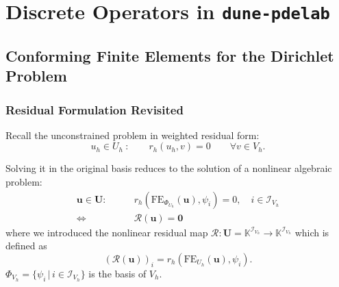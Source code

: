 \section{Discrete Operators in  \texttt{dune-pdelab}}

\subsection{Conforming Finite Elements for the Dirichlet Problem}

\begin{frame}
\frametitle<presentation>{Residual Formulation Revisited}
Recall the unconstrained problem in weighted residual form:
\begin{equation*}
u_h\in U_h\ : \qquad r_h(u_h,v) = 0 \qquad \forall
v\in V_h .
\end{equation*}

Solving it in the original basis
reduces to the solution of a nonlinear algebraic problem:
\begin{equation*}
\begin{split}
\mathbf{u}\in\mathbf{U} : \qquad
& r_h\left(\text{FE}_{\Phi_{U_h}}(\mathbf{u}),\psi_i\right) = 0, \quad
i\in\mathcal{I}_{V_h} \\
\Leftrightarrow \  & \mathcal{R}(\mathbf{u}) = \mathbf{0}
\end{split}
\end{equation*}
where we introduced the nonlinear residual map $\mathcal{R} :
\mathbf{U} = \mathbb{K}^{\mathcal{I}_{V_h}} \to \mathbb{K}^{\mathcal{I}_{V_h}}$ which is defined as 
\begin{equation*}
\left(
\mathcal{R}(\mathbf{u})\right)_i =
r_h(\text{FE}_{U_h}(\mathbf{u}),\psi_i).
\end{equation*}
$\Phi_{V_h} = \{\psi_i\,|\, i\in\mathcal{I}_{V_h}\}$ is the basis of $V_h$.  
\end{frame}

